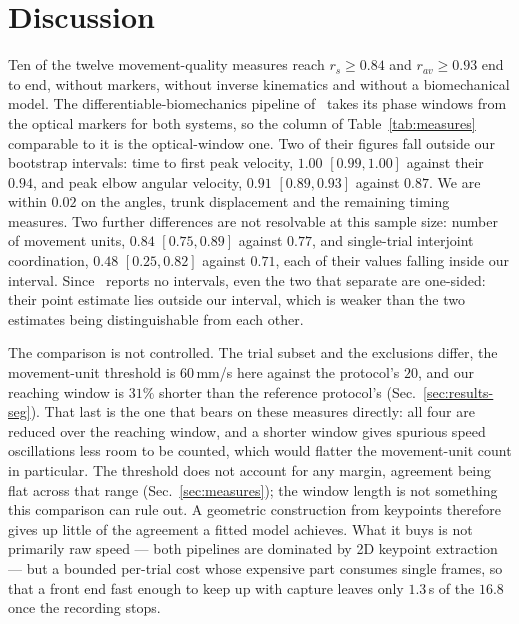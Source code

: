 \documentclass[conference]{IEEEtran}
\begin{document}
\section{Discussion}
\label{sec:discussion}
Ten of the twelve movement-quality measures reach $r_s \ge 0.84$ and
$r_{av} \ge 0.93$ end to end, without markers, without inverse kinematics and
without a biomechanical model. The differentiable-biomechanics pipeline
of~\cite{unger2024} takes its phase windows from the optical markers for both
systems, so the column of Table~\ref{tab:measures} comparable to it is the
optical-window one. Two of their figures fall outside our bootstrap
intervals: time to first peak velocity, $1.00$ $[0.99, 1.00]$ against their
$0.94$, and peak elbow angular velocity, $0.91$ $[0.89, 0.93]$ against $0.87$.
We are within $0.02$ on the angles, trunk displacement and the remaining timing
measures. Two further differences are not resolvable at this sample size: number
of movement units, $0.84$ $[0.75, 0.89]$ against $0.77$, and single-trial
interjoint coordination, $0.48$ $[0.25, 0.82]$ against $0.71$, each of their
values falling inside our interval. Since~\cite{unger2024} reports no intervals,
even the two that separate are one-sided: their point estimate lies outside our
interval, which is weaker than the two estimates being distinguishable from each
other.

The comparison is not controlled. The trial subset and the exclusions differ, the
movement-unit threshold is $60$\,mm/s here against the protocol's $20$, and our
reaching window is $31\%$ shorter than the reference protocol's
(Sec.~\ref{sec:results-seg}). That last is the one that bears on these
measures directly: all four are reduced over the reaching window, and a shorter
window gives spurious speed oscillations less room to be counted, which would
flatter the movement-unit count in particular. The threshold does not account for
any margin, agreement being flat across that range (Sec.~\ref{sec:measures}); the
window length is not something this comparison can rule out. A
geometric construction from keypoints therefore gives up little of the agreement
a fitted model achieves. What it buys is not primarily raw speed --- both
pipelines are dominated by 2D keypoint extraction --- but a bounded per-trial
cost whose expensive part consumes single frames, so that a front end fast
enough to keep up with capture leaves only $1.3$\,s of the $16.8$ once the
recording stops.
\end{document}
